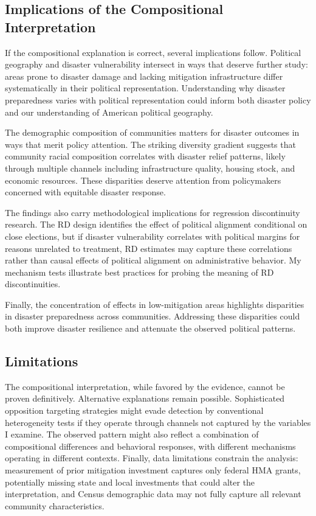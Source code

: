 \documentclass[12pt,letterpaper,oneside]{book}
\begin{document}
\subsection{Implications of the Compositional Interpretation}

If the compositional explanation is correct, several implications follow. Political geography and disaster vulnerability intersect in ways that deserve further study: areas prone to disaster damage and lacking mitigation infrastructure differ systematically in their political representation. Understanding why disaster preparedness varies with political representation could inform both disaster policy and our understanding of American political geography.

The demographic composition of communities matters for disaster outcomes in ways that merit policy attention. The striking diversity gradient suggests that community racial composition correlates with disaster relief patterns, likely through multiple channels including infrastructure quality, housing stock, and economic resources. These disparities deserve attention from policymakers concerned with equitable disaster response.

The findings also carry methodological implications for regression discontinuity research. The RD design identifies the effect of political alignment conditional on close elections, but if disaster vulnerability correlates with political margins for reasons unrelated to treatment, RD estimates may capture these correlations rather than causal effects of political alignment on administrative behavior. My mechanism tests illustrate best practices for probing the meaning of RD discontinuities.

Finally, the concentration of effects in low-mitigation areas highlights disparities in disaster preparedness across communities. Addressing these disparities could both improve disaster resilience and attenuate the observed political patterns.

\subsection{Limitations}

The compositional interpretation, while favored by the evidence, cannot be proven definitively. Alternative explanations remain possible. Sophisticated opposition targeting strategies might evade detection by conventional heterogeneity tests if they operate through channels not captured by the variables I examine. The observed pattern might also reflect a combination of compositional differences and behavioral responses, with different mechanisms operating in different contexts. Finally, data limitations constrain the analysis: measurement of prior mitigation investment captures only federal HMA grants, potentially missing state and local investments that could alter the interpretation, and Census demographic data may not fully capture all relevant community characteristics.
\end{document}
